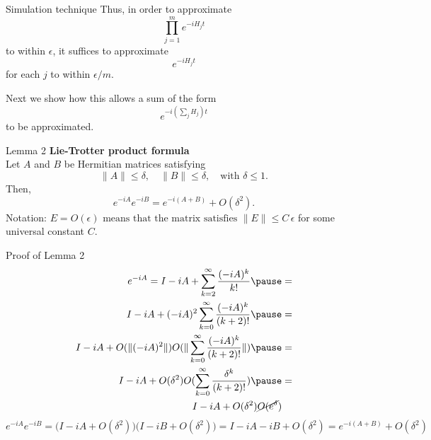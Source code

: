 \documentclass[aspectratio=169,xcolor=dvipsnames]{beamer}
\begin{document}
\begin{frame}{Simulation technique}
Thus, in order to approximate 
\[
\prod_{j=1}^m e^{-iH_j t}
\]
to within \(\epsilon\), it suffices to approximate 
\[
e^{-iH_j t}
\]
for each \(j\) to within \(\epsilon/m\). 

\vspace{1em}
Next we show how this allows a sum of the form 
\[
e^{-i\left(\sum_{j} H_j\right)t}
\]
to be approximated.
\end{frame}

\begin{frame}{Lemma 2}
\textbf{Lie-Trotter product formula} \\
Let \(A\) and \(B\) be Hermitian matrices satisfying
\[
\|A\| \le \delta, \quad \|B\| \le \delta, \quad \text{with } \delta \le 1.
\]
Then,
\[
e^{-iA} e^{-iB} = e^{-i(A+B)} + O(\delta^2).
\]
Notation: \( E = O(\epsilon) \text{ means that the matrix satisfies }
\|E\| \le C\,\epsilon
\) for some universal constant $C$.

\end{frame}

\begin{frame}{Proof of Lemma 2}
\[
\begin{aligned}
e^{-iA} = I - iA + \sum_{k=2}^{\infty} \frac{(-iA)^k}{k!}
\pause
&= \\ I - iA + (-iA)^2 \sum_{k=0}^{\infty} \frac{(-iA)^k}{(k+2)!}
\pause
&= \\ I - iA + O(\|(-iA)^2\|) O(\|\sum_{k=0}^{\infty} \frac{(-iA)^k}{(k+2)!}\|)
\pause
&= \\ I - iA + O(\delta^2) O(\sum_{k=0}^{\infty} \frac{\delta^k}{(k+2)!})
\pause
&= \\ I - iA + O(\delta^2) \cancel{O(e^{\delta}})
\end{aligned}
\]
\pause
\[
e^{-iA} e^{-iB}
= \bigl(I - iA + O(\delta^2)\bigr)\bigl(I - iB + O(\delta^2)\bigr)
= I - iA - iB + O(\delta^2)
= e^{-i(A+B)} + O(\delta^2)
\]
\end{frame}

\end{document}

